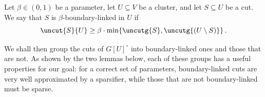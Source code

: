 \begin{definition}
	\label{def:boundlinkcuts}
	Let $\beta \in (0,1)$ be a parameter, let $U \subseteq V$ be a cluster, and let $S \subseteq U$ be a cut. We say that $S$ is $\beta$-boundary-linked in $U$ if
	\begin{equation*}
		\uncut{S}{U} \ge \beta \cdot \min\{\uncutg{S}, \uncutg{(U \setminus S)}\} \, .
	\end{equation*}
\end{definition}
\noindent
We shall then group the cuts of $G[U]^\circ$ into boundary-linked ones and those that are not. As shown by the two lemmas below, each of these groups has a useful properties for our goal: for a correct set of parameters, boundary-linked cuts are very well approximated by a sparsifier, while those that are not boundary-linked must be sparse.

